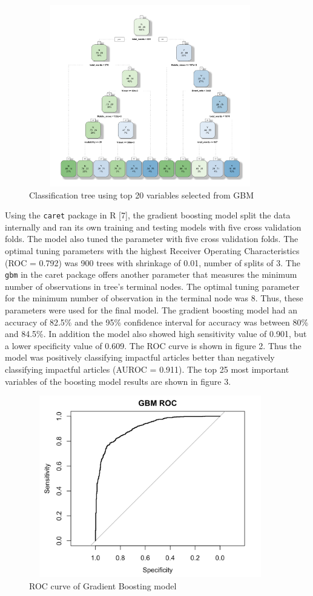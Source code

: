 \documentclass[10pt,letterpaper]{article}
\begin{document}
\begin{figure}
\includegraphics[width=400px,height=300px]{classification-Tree} \caption{ Classification tree using top 20 variables selected from GBM}\label{fig:unnamed-chunk-2}
\end{figure}

Using the \texttt{caret} package in R {[}7{]}, the gradient boosting
model split the data internally and ran its own training and testing
models with five cross validation folds. The model also tuned the
parameter with five cross validation folds. The optimal tuning
parameters with the highest Receiver Operating Characteristics (ROC =
0.792) was 900 trees with shrinkage of 0.01, number of splits of 3. The
\texttt{gbm} in the caret package offers another parameter that measures
the minimum number of observations in tree's terminal nodes. The optimal
tuning parameter for the minimum number of observation in the terminal
node was 8. Thus, these parameters were used for the final model. The
gradient boosting model had an accuracy of 82.5\% and the 95\%
confidence interval for accuracy was between 80\% and 84.5\%. In
addition the model also showed high sensitivity value of 0.901, but a
lower specificity value of 0.609. The ROC curve is shown in figure 2.
Thus the model was positively classifying impactful articles better than
negatively classifying impactful articles (AUROC = 0.911). The top 25
most important variables of the boosting model results are shown in
figure 3.

\begin{figure}
\includegraphics[width=400px,height=300px]{roc_gbm} \caption{ROC curve of Gradient Boosting model}\label{fig:unnamed-chunk-3}
\end{figure}
\end{document}
